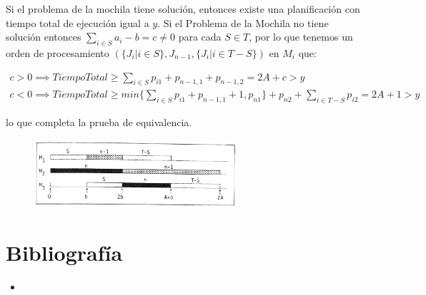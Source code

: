 \documentclass[11pt, a4paper,spanish]{article}
\begin{document}
					Si el problema de la mochila tiene solución, entonces existe una planificación con tiempo total de ejecución igual a $y$. Si el Problema de la Mochila no tiene solución entonces  $\sum_{i\in S}a_{i} - b = c \neq 0$ para cada  $S \in T$, por lo que tenemos un orden de procesamiento $( \{J_{i} | i \in S\},J_{n-1} , \{J_{i} | i \in T-S\})$ en $M_{i}$ que:

					\begin{gather}
						c > 0 \implies  TiempoTotal \geq \sum_{i\in S}p_{i1} + p_{n-1,1} + p_{n-1, 2} = 2A + c > y\\ 
						c < 0 \implies  TiempoTotal \geq  min\{ \sum_{i\in S}p_{i1} +p_{n-1,1}+1,p_{n1} \}+ p_{n2}  + \sum_{i\in T-S}p_{i2} = 2A + 1 > y
					\end{gather}
					
					lo que completa la prueba de equivalencia.
					
					\begin{figure}[H]
						\centering
						\includegraphics[width=75mm]{res/example2.png}
					\end{figure}

	\newpage

		\section{Bibliografía}

			\begin{itemize}
			
				\item 		
			\end{itemize}
\end{document}
